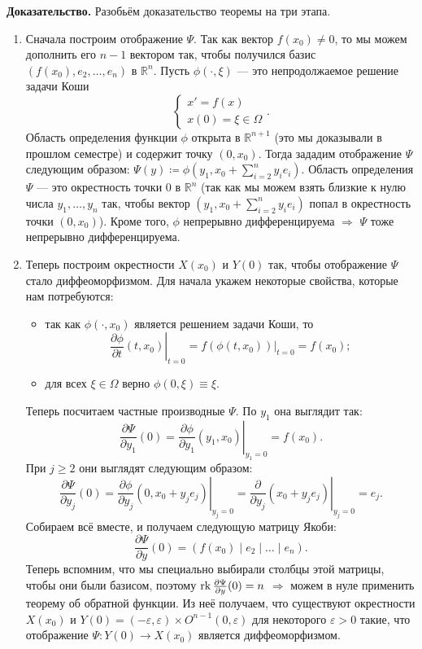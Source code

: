 \textbf{Доказательство.} Разобьём доказательство теоремы на три этапа.
\begin{enumerate}
    \item Сначала построим отображение $\Psi$. Так как вектор $f(x_0) \ne 0$, то мы можем дополнить его $n-1$ вектором так, чтобы получился базис $(f(x_0), e_2, \dots, e_n)$ в $\mathbb R^n$. Пусть $\phi(\cdot, \xi)$ --- это непродолжаемое решение задачи Коши
    \[
        \begin{cases}
            x' = f(x)\\
            x(0) = \xi \in \Omega
        \end{cases}.
    \]
    Область определения функции $\phi$ открыта в $\mathbb R^{n+1}$ (это мы доказывали в прошлом семестре) и содержит точку $(0, x_0)$. Тогда зададим отображение $\Psi$ следующим образом: $\Psi(y) \coloneq \phi(y_1, x_0 + \sum_{i=2}^n y_ie_i)$. Область определения $\Psi$ --- это окрестность точки $0$ в $\mathbb R^n$ (так как мы можем взять близкие к нулю числа $y_1, \dots, y_n$ так, чтобы вектор $(y_1, x_0 + \sum_{i=2}^n y_ie_i)$ попал в окрестность точки $(0, x_0)$).
    Кроме того, $\phi$ непрерывно дифференцируема $\Rightarrow$ $\Psi$ тоже непрерывно дифференцируема.
    \item Теперь построим окрестности $X(x_0)$ и $Y(0)$ так, чтобы отображение $\Psi$ стало диффеоморфизмом. Для начала укажем некоторые свойства, которые нам потребуются:
    \begin{itemize}
        \item так как $\phi(\cdot, x_0)$ является решением задачи Коши, то 
        \[\left.\frac{\partial \phi}{\partial t}(t, x_0)\right|_{t=0} = \left.f(\phi(t, x_0))\right|_{t=0} = f(x_0);\]
        \item для всех $\xi \in \Omega$ верно $\phi(0, \xi) \equiv \xi$.
    \end{itemize}
    Теперь посчитаем частные производные $\Psi$. По $y_1$ она выглядит так:
    \[
        \frac{\partial \Psi}{\partial y_1}(0) = \left.\frac{\partial \phi}{\partial y_1}(y_1, x_0)\right|_{y_1=0} = f(x_0).
    \]
    При $j \geq 2$ они выглядят следующим образом:
    \[
        \frac{\partial \Psi}{\partial y_j}(0) = \left.\frac{\partial \phi}{\partial y_j}(0, x_0 + y_je_j)\right|_{y_j=0} = \left.\frac{\partial}{\partial y_j}(x_0 + y_je_j)\right|_{y_j=0} = e_j.
    \]
    Собираем всё вместе, и получаем следующую матрицу Якоби: \[\frac{\partial \Psi}{\partial y}(0) = (f(x_0) \;|\; e_2 \;|\; \dots \;|\; e_n).\]
    Теперь вспомним, что мы специально выбирали столбцы этой матрицы, чтобы они были базисом, поэтому $\operatorname{rk} \frac{\partial \Psi}{\partial y}(0) = n$ $\Rightarrow$ можем в нуле применить теорему об обратной функции. Из неё получаем, что существуют окрестности $X(x_0)$ и $Y(0) = (-\varepsilon, \varepsilon) \times O^{n-1}(0, \varepsilon)$ для некоторого $\varepsilon > 0$ такие, что отображение $\Psi\colon Y(0) \to X(x_0)$ является диффеоморфизмом.

\end{enumerate}
